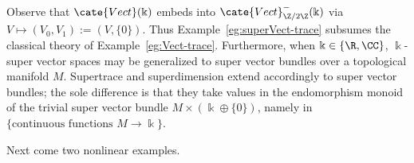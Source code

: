 Observe that $\cate{Vect}(\Bbbk)$ embeds into
$\cate{Vect}^-_{\Z/2\Z}(\Bbbk)$ via
$V\mapsto(V_0,V_1):=(V,\{0\})$. Thus Example~\ref{eg:superVect-trace}
subsumes the classical theory of Example~\ref{eg:Vect-trace}. Furthermore,
when $\Bbbk\in\{\R,\CC\}$, $\Bbbk$-super vector spaces may be generalized
to super vector bundles over a topological manifold $M$. Supertrace and
superdimension extend accordingly to super vector bundles; the sole
difference is that they take values in the endomorphism monoid of the trivial
super vector bundle $M\times(\Bbbk\oplus\{0\})$, namely in
$\{\text{continuous functions }M\to\Bbbk\}$.

Next come two nonlinear examples.

